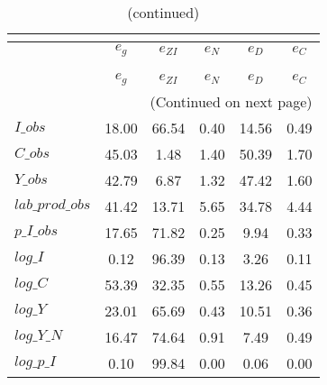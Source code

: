 
\begin{center}
\begin{longtable}{lccccc} 
\caption{VARIANCE DECOMPOSITION (in percent)}\\
 \label{Table:th_var_decomp_uncond}\\
\toprule 
$                $	 & 	 $       {e_g}$	 & 	 $    {e_{ZI}}$	 & 	 $       {e_N}$	 & 	 $       {e_D}$	 & 	 $       {e_C}$\\
\midrule \endfirsthead 
\caption{(continued)}\\
 \toprule \\ 
$                $	 & 	 $       {e_g}$	 & 	 $    {e_{ZI}}$	 & 	 $       {e_N}$	 & 	 $       {e_D}$	 & 	 $       {e_C}$\\
\midrule \endhead 
\midrule \multicolumn{6}{r}{(Continued on next page)} \\ \bottomrule \endfoot 
\bottomrule \endlastfoot 
$I\_obs          $	 & 	       18.00	 & 	       66.54	 & 	        0.40	 & 	       14.56	 & 	        0.49 \\ 
$C\_obs          $	 & 	       45.03	 & 	        1.48	 & 	        1.40	 & 	       50.39	 & 	        1.70 \\ 
$Y\_obs          $	 & 	       42.79	 & 	        6.87	 & 	        1.32	 & 	       47.42	 & 	        1.60 \\ 
$lab\_prod\_obs  $	 & 	       41.42	 & 	       13.71	 & 	        5.65	 & 	       34.78	 & 	        4.44 \\ 
$p\_I\_obs       $	 & 	       17.65	 & 	       71.82	 & 	        0.25	 & 	        9.94	 & 	        0.33 \\ 
$log\_I          $	 & 	        0.12	 & 	       96.39	 & 	        0.13	 & 	        3.26	 & 	        0.11 \\ 
$log\_C          $	 & 	       53.39	 & 	       32.35	 & 	        0.55	 & 	       13.26	 & 	        0.45 \\ 
$log\_Y          $	 & 	       23.01	 & 	       65.69	 & 	        0.43	 & 	       10.51	 & 	        0.36 \\ 
$log\_Y\_N       $	 & 	       16.47	 & 	       74.64	 & 	        0.91	 & 	        7.49	 & 	        0.49 \\ 
$log\_p\_I       $	 & 	        0.10	 & 	       99.84	 & 	        0.00	 & 	        0.06	 & 	        0.00 \\ 
\end{longtable}
 \end{center}

